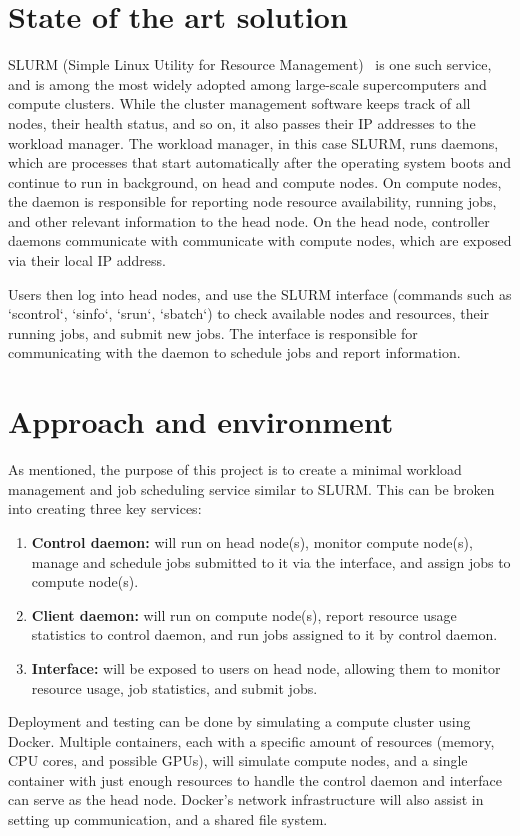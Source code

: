 \documentclass[letterpaper, 11pt]{article}
\begin{document}
\section{State of the art solution}
SLURM (Simple Linux Utility for Resource Management)~\cite{yoo2003slurm} is one such service, and is among the most widely 
adopted among large-scale supercomputers and compute clusters.
While the cluster management software keeps track of all nodes, their health status, and so on, it also passes their IP 
addresses to the workload manager.
The workload manager, in this case SLURM, runs daemons, which are processes that start automatically after 
the operating system boots and continue to run in background, on head and compute nodes.
On compute nodes, the daemon is responsible for reporting node resource availability, running jobs, and other relevant
information to the head node.
On the head node, controller daemons communicate with communicate with compute nodes, which are exposed via their local IP 
address.

Users then log into head nodes, and use the SLURM interface (commands such as `scontrol`, `sinfo`, `srun`, `sbatch`) to check
available nodes and resources, their running jobs, and submit new jobs.
The interface is responsible for communicating with the daemon to schedule jobs and report information.

\section{Approach and environment}
As mentioned, the purpose of this project is to create a minimal workload management and job scheduling service similar to
SLURM. This can be broken into creating three key services:

\begin{enumerate}
  \item \textbf{Control daemon:} will run on head node(s), monitor compute node(s), manage and schedule jobs submitted to it via
    the interface, and assign jobs to compute node(s).
  \item \textbf{Client daemon:} will run on compute node(s), report resource usage statistics to control daemon, and run jobs
    assigned to it by control daemon.
  \item \textbf{Interface:} will be exposed to users on head node, allowing them to monitor resource usage, job statistics, and
    submit jobs.
\end{enumerate}

Deployment and testing can be done by simulating a compute cluster using Docker.
Multiple containers, each with a specific amount of resources (memory, CPU cores, and possible GPUs), will simulate compute
nodes, and a single container with just enough resources to handle the control daemon and interface can serve as the head node.
Docker's network infrastructure will also assist in setting up communication, and a shared file system.
\end{document}
